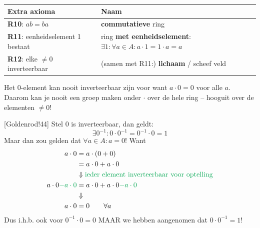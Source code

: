\begin{center}
    \renewcommand{\arraystretch}{1.5}
    \begin{tabularx}{\linewidth}{@{} >{\hsize}L >{\hsize}L @{}}
        \textbf{Extra axioma} & \textbf{Naam} \\
        \hline
        \textbf{R10}: $ab = ba$ & \textbf{commutatieve} ring  \\
        \thinrule
        \textbf{R11}: eenheidselement 1 bestaat & ring \textbf{met eenheidselement}: $\exists 1 : \forall a \in A : a \cdot 1 = 1 \cdot a = a$  \\
        \thinrule
        \textbf{R12}: elke $\neq 0$ inverteerbaar & (samen met R11:) \textbf{lichaam} / scheef veld  \\
        \hline
    \end{tabularx}
\end{center}

\begin{barbox}[PineGreen][gray!3]
    \textbf{} Het 0-element kan nooit inverteerbaar zijn voor \inlinetext{$\cdot$} want $a\cdot 0 = 0$ voor alle $a$. Daarom kan je nooit een groep maken onder $\cdot$ over de hele ring -- hooguit over de elementen $\neq 0$!
\end{barbox}

[Goldenrod!44] Stel $0$ is inverteerbaar, dan geldt:
\begin{equation*}
    \exists 0^{-1} : 0 \cdot 0^{-1} = 0^{-1} \cdot 0 = 1
\end{equation*}
Maar dan zou gelden dat $\forall a \in A: a = 0$! Want
\begin{equation*}
    \begin{aligned}
        a \cdot 0 &= a \cdot (0+0) \\
                  &= a \cdot 0 + a \cdot 0 \\
        &\Downarrow \textcolor{Green}{ \text{ieder element inverteerbaar voor optelling}} \\
        a \cdot 0 \textcolor{Green}{ - a \cdot 0} &= a \cdot 0 + a \cdot 0 \textcolor{Green}{- a \cdot 0} \\
        &\Downarrow \\
        a \cdot 0 &= 0 \qquad \forall a
    \end{aligned}
\end{equation*}
Dus i.h.b. ook voor $0^{-1} \cdot 0 = 0$ MAAR we hebben aangenomen dat $0 \cdot 0^{-1} = 1$!

